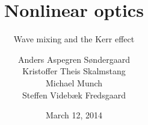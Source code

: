 \documentclass[xcolor=svgnames,smaller,draft]{beamer}
\title{Nonlinear optics}
\subtitle{Wave mixing and the Kerr effect}
\author{
  Anders Aspegren Søndergaard \\
  Kristoffer Theis Skalmstang \\
  Michael Munch \\
  Steffen Videbæk Fredsgaard \\
}
\date{March 12, 2014}
\begin{document}

\frame{\titlepage}





\end{document}
